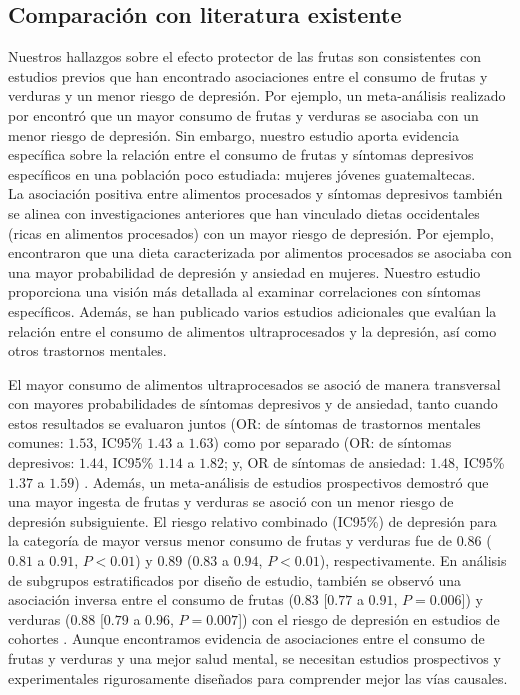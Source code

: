 \documentclass[stu, 12pt]{apa7}
\begin{document}
	\subsection{Comparación con literatura existente}\label{comparaciuxf3n-con-literatura-existente}

	Nuestros hallazgos sobre el efecto protector de las frutas son consistentes con estudios previos que han encontrado asociaciones entre el consumo de frutas y verduras y un menor riesgo de depresión. Por ejemplo, un meta-análisis realizado por \parencite{liuFruitVegetableConsumption2016} encontró que un mayor consumo de frutas y verduras se asociaba con un menor riesgo de depresión. Sin embargo, nuestro estudio aporta evidencia específica sobre la relación entre el consumo de frutas y síntomas depresivos específicos en una población poco estudiada: mujeres jóvenes guatemaltecas.\\

	La asociación positiva entre alimentos procesados y síntomas depresivos también se alinea con investigaciones anteriores que han vinculado dietas occidentales (ricas en alimentos procesados) con un mayor riesgo de depresión. Por ejemplo, \parencite{laneUltraProcessedFoodConsumption2022} encontraron que una dieta caracterizada por alimentos procesados se asociaba con una mayor probabilidad de depresión y ansiedad en mujeres. Nuestro estudio proporciona una visión más detallada al examinar correlaciones con síntomas específicos. Además, se han publicado varios estudios adicionales que evalúan la relación entre el consumo de alimentos ultraprocesados y la depresión, así como otros trastornos mentales. 
	
	El mayor consumo de alimentos ultraprocesados se asoció de manera transversal con mayores probabilidades de síntomas depresivos y de ansiedad, tanto cuando estos resultados se evaluaron juntos (OR: de síntomas de trastornos mentales comunes: $1.53$, IC95\% $1.43$ a $1.63$) como por separado (OR: de síntomas depresivos: $1.44$, IC95\% $1.14$ a $1.82$; y, OR de síntomas de ansiedad: $1.48$, IC95\% $1.37$ a $1.59$) \parencite{laneUltraProcessedFoodConsumption2022}. Además, un meta-análisis de estudios prospectivos demostró que una mayor ingesta de frutas y verduras se asoció con un menor riesgo de depresión subsiguiente. El riesgo relativo combinado (IC95\%) de depresión para la categoría de mayor versus menor consumo de frutas y verduras fue de $0.86$ ($0.81$ a $0.91$, $P < 0.01$) y $0.89$ ($0.83$ a $0.94$, $P < 0.01$), respectivamente. En análisis de subgrupos estratificados por diseño de estudio, también se observó una asociación inversa entre el consumo de frutas ($0.83$ [$0.77$ a $0.91$, $P = 0.006$]) y verduras ($0.88$ [$0.79$ a $0.96$, $P = 0.007$]) con el riesgo de depresión en estudios de cohortes \parencite{liuFruitVegetableConsumption2016}. Aunque encontramos evidencia de asociaciones entre el consumo de frutas y verduras y una mejor salud mental, se necesitan estudios prospectivos y experimentales rigurosamente diseñados para comprender mejor las vías causales.
\end{document}
